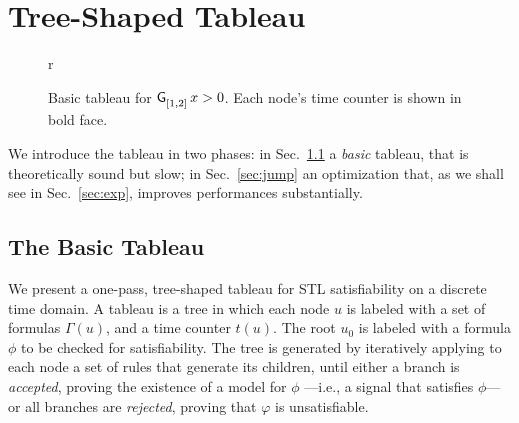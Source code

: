 \documentclass[acmsmall,screen]{acmart}
\begin{document}
\section{Tree-Shaped Tableau}
\label{sec:tableau}

\begin{figure}[18]{r}
\footnotesize
{}
\caption{Basic tableau for $\mathop{\mathsf{\mathsf{G}}^{{}}_{[1,2]}} x > 0$.
    Each node's time counter is shown in bold face.}
\label{fig:G-example}
\end{figure}
We introduce the tableau in two phases:
in Sec.~\ref{sec:basic-tableau} a \emph{basic} tableau,
that is theoretically sound but slow;
in Sec.~\ref{sec:jump} an optimization that, as we shall see in Sec.~\ref{sec:exp},
improves performances substantially.

\subsection{The Basic Tableau}
\label{sec:basic-tableau}

We present a one-pass, tree-shaped tableau for STL satisfiability on a discrete time domain.
A tableau is a tree in which each node $u$ is labeled with a set of formulas $\Gamma(u)$, and a time counter $t(u)$.
The root $u_0$ is labeled with a formula $\phi$ to be checked for satisfiability.
The tree is generated by iteratively applying to each node a set of rules that generate its children,
until either a branch is \emph{accepted}, proving the existence of a model for $\phi$%
---i.e., a signal that satisfies $\phi$---%
or all branches are \emph{rejected}, proving that $\varphi$ is unsatisfiable.
\end{document}
